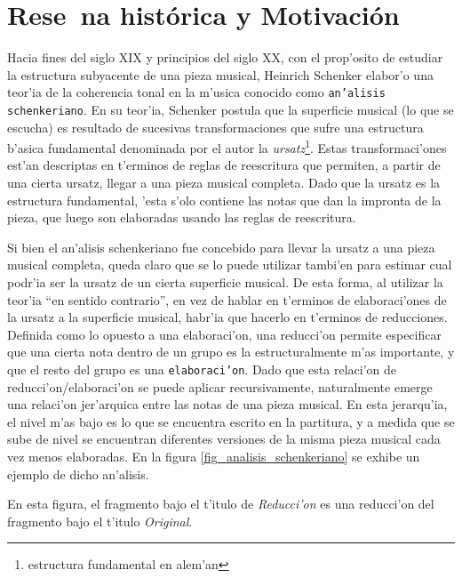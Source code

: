 \section{Rese~na hist\'orica y Motivaci\'on}
Hacia fines del siglo XIX y principios del siglo XX, con el prop'osito de estudiar la estructura subyacente de una pieza musical, 
Heinrich Schenker elabor'o una teor'ia de la coherencia tonal en la m'usica conocido como \texttt{an'alisis schenkeriano}.
En su teor'ia, Schenker postula que la superficie musical (lo que se escucha) es resultado de sucesivas transformaciones que sufre una estructura b'asica fundamental 
denominada por el autor la \emph{ursatz}\footnote{estructura fundamental en alem'an}. Estas transformaci'ones est'an descriptas en t'erminos de reglas de reescritura que permiten, 
a partir de una cierta ursatz, llegar a una pieza musical completa. Dado que la ursatz es la estructura fundamental, 'esta s'olo contiene las notas que dan la impronta de la pieza, 
que luego son elaboradas usando las reglas de reescritura.

Si bien el an'alisis schenkeriano fue concebido para llevar la ursatz a una pieza musical completa, queda claro que se lo puede utilizar tambi'en para estimar
cual podr'ia ser la ursatz de un cierta superficie musical. De esta forma, al utilizar la teor'ia ``en sentido contrario'', en vez de hablar en t'erminos de elaboraci'ones de 
la ursatz a la superficie musical, habr'ia que hacerlo en t'erminos de reducciones. Definida como lo opuesto a una elaboraci'on, una reducci'on permite especificar que una cierta 
nota dentro de un grupo es la estructuralmente m'as importante, y que el resto del grupo es una \texttt{elaboraci'on}. 
Dado que esta relaci'on de reducci'on/elaboraci'on se puede aplicar recursivamente, naturalmente emerge una relaci'on 
jer'arquica entre las notas de una pieza musical.  En esta jerarqu'ia, el nivel m'as bajo es lo que se encuentra escrito en la partitura, y a medida que se sube de nivel se 
encuentran diferentes versiones de la misma pieza musical cada vez menos elaboradas. En la figura \ref{fig_analisis_schenkeriano} se exhibe un ejemplo de dicho an'alisis.


\begin{imagen}
\end{imagen}


En esta figura, el fragmento bajo el t'itulo de \emph{Reducci'on} es una reducci'on del fragmento bajo el t'itulo \emph{Original}.

